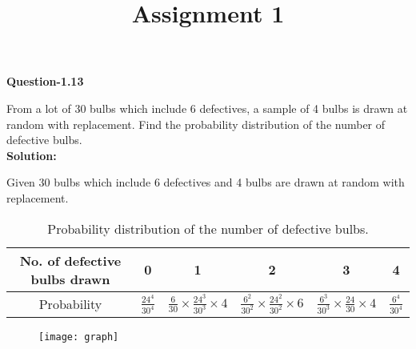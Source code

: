\documentclass[11pt]{article}
\begin{document}
\title{Assignment 1}
\maketitle

\textbf{Question-1.13}

From a lot of 30 bulbs which include 6 defectives, a sample of 4 bulbs is drawn at random with replacement. Find the probability distribution of the number of defective bulbs.\\

\textbf{Solution:}

Given 30 bulbs which include 6 defectives and 4 bulbs are drawn at random with replacement.

\begin{table}[ht]
\centering
\caption{Probability distribution of the number of defective bulbs.}
\begin{tabular}{|c|c|c|c|c|c|}
\hline
No. of defective bulbs drawn & 0 & 1& 2& 3& 4\\
\hline
Probability & $\frac{24^4}{30^4}$  & $\frac{6}{30}\times\frac{24^3}{30^3}\times4$ & $\frac{6^2}{30^2}\times\frac{24^2}{30^2}\times6$ & $\frac{6^3}{30^3}\times\frac{24}{30}\times4$ & $\frac{6^4}{30^4}$\\
\hline
\end{tabular}
\end{table}

\begin{figure}[h]
\texttt{[image: graph]}

\end{figure}
\end{document}
